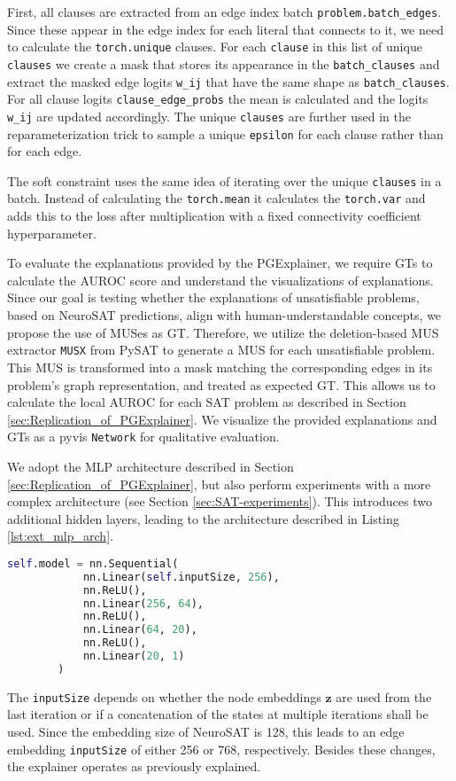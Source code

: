 First, all clauses are extracted from an edge index batch \lstinline|problem.batch_edges|. Since these appear in the edge index for each literal that connects to it, we need to calculate the \lstinline|torch.unique| clauses. For each \lstinline|clause| in this list of unique \lstinline|clauses| we create a mask that stores its appearance in the \lstinline|batch_clauses| and extract the masked edge logits \lstinline|w_ij| that have the same shape as \lstinline|batch_clauses|. For all clause logits \lstinline|clause_edge_probs| the mean is calculated and the logits \lstinline|w_ij| are updated accordingly.
The unique \lstinline|clauses| are further used in the reparameterization trick to sample a unique \lstinline|epsilon| for each clause rather than for each edge.

The soft constraint uses the same idea of iterating over the unique \lstinline|clauses| in a batch. Instead of calculating the \lstinline|torch.mean| it calculates the \lstinline|torch.var| and adds this to the loss after multiplication with a fixed connectivity coefficient hyperparameter. \bigskip

To evaluate the explanations provided by the PGExplainer, we require \acp{GT} to calculate the AUROC score and understand the visualizations of explanations. Since our goal is testing whether the explanations of unsatisfiable problems, based on NeuroSAT predictions, align with human-understandable concepts, we propose the use of MUSes as \ac{GT}. Therefore, we utilize the deletion-based MUS extractor \lstinline|MUSX| from PySAT \cite{imms-sat18} to generate a MUS for each unsatisfiable problem. This \ac{MUS} is transformed into a mask matching the corresponding edges in its problem's graph representation, and treated as expected \ac{GT}. This allows us to calculate the local AUROC for each SAT problem as described in Section \ref{sec:Replication_of_PGExplainer}. We visualize the provided explanations and \acp{GT} as a pyvis \cite{perrone2020network} \lstinline|Network| for qualitative evaluation. \bigskip

We adopt the MLP architecture described in Section \ref{sec:Replication_of_PGExplainer}, but also perform experiments with a more complex architecture (see Section \ref{sec:SAT-experiments}). This introduces two additional hidden layers, leading to the architecture described in Listing \ref{lst:ext_mlp_arch}.
\begin{lstlisting}[language=Python, caption=TODO: REMOVE? VIS differently? Implementation of extended MLP architecture., label=lst:ext_mlp_arch]
    self.model = nn.Sequential(
            nn.Linear(self.inputSize, 256),
            nn.ReLU(),
            nn.Linear(256, 64),
            nn.ReLU(),
            nn.Linear(64, 20),
            nn.ReLU(),
            nn.Linear(20, 1)
        )
\end{lstlisting}
The \lstinline|inputSize| depends on whether the node embeddings $\mathbf{z}$ are used from the last iteration or if a concatenation of the states at multiple iterations shall be used. Since the embedding size of NeuroSAT is 128, this leads to an edge embedding \lstinline|inputSize| of either 256 or 768, respectively. Besides these changes, the explainer operates as previously explained.